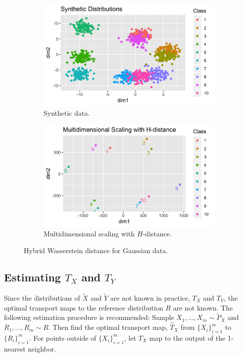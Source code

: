 \documentclass[11pt, a4paper, fleqn]{article}
\numberwithin{equation}{section}
\numberwithin{figure}{section}
\numberwithin{table}{section}
\begin{document}
\begin{figure}[b]
\begin{subfigure}[b]{.5\textwidth}
\centering
\includegraphics[width=\linewidth]{LabeledNormalPlot}
        \caption{Synthetic data.}
        \label{fig:synthetic_exp_1}
\end{subfigure}
\begin{subfigure}[b]{.5\textwidth}
\centering
\includegraphics[width=\linewidth]{MDSNormalPlot}
        \caption{Multidimensional scaling with $H$-distance.}
        \label{fig:synthetic_exp_2}
\end{subfigure}
\caption{Hybrid Wasserstein distance for Gaussian data.}
\label{fig:synthetic_exp}
\end{figure}

\subsection{Estimating $T_X$ and $T_Y$}
Since the distributions of $\tilde{X}$ and $\tilde{Y}$ are not known in practice, $T_X$ and $T_Y$, the optimal transport maps to the reference distribution $R$ are not known. The following estimation procedure is recommended: Sample $X_1, ..., X_m \sim \tilde{P}_X$ and $R_1, ..., R_m \sim R$. Then find the optimal transport map, $\hat{T}_X$ from $\{X_i\}_{i=1}^m$ to $\{R_i\}_{i=1}^m$. For points outside of $\{X_i\}_{i=1}^m$, let $T_X$ map to the output of the 1-nearest neighbor.
\end{document}
